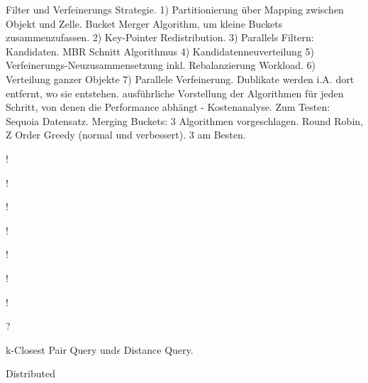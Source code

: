 \documentclass[a4paper,12pt,twoside]{article}
\begin{document}
Filter und Verfeinerungs Strategie. 1) Partitionierung über Mapping zwischen Objekt und Zelle. Bucket Merger Algorithm, um kleine Buckets zusammenzufassen. 2) Key-Pointer Redistribution. 3) Parallels Filtern: Kandidaten. MBR Schnitt Algorithmus 4) Kandidatenneuverteilung 5) Verfeinerungs-Neuzusammensetzung inkl. Rebalanzierung Workload. 6) Verteilung ganzer Objekte 7) Parallele Verfeinerung. Dublikate werden i.A. dort entfernt, wo sie entstehen. ausführliche Vorstellung der Algorithmen für jeden Schritt, von denen die Performance abhängt - Kostenanalyse. Zum Testen: Sequoia Datensatz. Merging Buckets: 3 Algorithmen vorgeschlagen. Round Robin, Z Order Greedy (normal und verbessert). 3 am Besten. 

\textbf{}!



\textbf{}!


\textbf{}!

\textbf{}!

\textbf{}!

\textbf{}!


\textbf{}!


\textbf{}?


\textbf{}


\textbf{}





\textbf{}





\textbf{}





\textbf{}


\textbf{}
k-Closest Pair Query und$\epsilon$ Distance Query.


\textbf{}
Distributed

\textbf{}


\textbf{}


\end{document}
